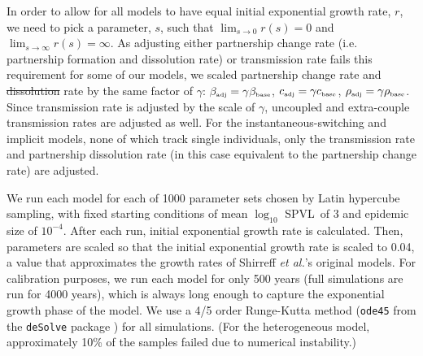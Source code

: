 \documentclass[10pt,letterpaper]{article}
\newcommand{\Lspvl}{$\log_{10}$ SPVL}
\newcommand{\etal}{\textit{et al.}}
\newcommand{\tsub}[2]{#1_{{\textrm{\tiny #2}}}}
\providecommand{\DIFaddtex}[1]{{\protect\color{blue}\uwave{#1}}} %
\providecommand{\DIFdeltex}[1]{{\protect\color{red}\sout{#1}}}                      %
\providecommand{\DIFaddbegin}{} %
\providecommand{\DIFaddend}{} %
\providecommand{\DIFdelbegin}{} %
\providecommand{\DIFdelend}{} %
\providecommand{\DIFadd}[1]{\texorpdfstring{\DIFaddtex{#1}}{#1}} %
\providecommand{\DIFdel}[1]{\texorpdfstring{\DIFdeltex{#1}}{}} %
\newcommand{\DIFscaledelfig}{0.5}
\newlength{\DIFdelgraphicswidth} %
\newlength{\DIFdelgraphicsheight} %
\newcommand{\DIFaddincludegraphics}[2][]{{\color{blue}\fbox{\DIFOincludegraphics[#1]{#2}}}} %
\newcommand{\DIFdelincludegraphics}[2][]{%
\sbox{\DIFdelgraphicsbox}{\DIFOincludegraphics[#1]{#2}}%
\settoboxwidth{\DIFdelgraphicswidth}{\DIFdelgraphicsbox} %
\settoboxtotalheight{\DIFdelgraphicsheight}{\DIFdelgraphicsbox} %
\scalebox{\DIFscaledelfig}{%
\parbox[b]{\DIFdelgraphicswidth}{\usebox{\DIFdelgraphicsbox}\\[-\baselineskip] \rule{\DIFdelgraphicswidth}{0em}}\llap{\resizebox{\DIFdelgraphicswidth}{\DIFdelgraphicsheight}{%
\setlength{\unitlength}{\DIFdelgraphicswidth}%
\begin{picture}(1,1)%
\thicklines\linethickness{2pt} %
{\color[rgb]{1,0,0}\put(0,0){\framebox(1,1){}}}%
{\color[rgb]{1,0,0}\put(0,0){\line( 1,1){1}}}%
{\color[rgb]{1,0,0}\put(0,1){\line(1,-1){1}}}%
\end{picture}%
}\hspace*{3pt}}} %
} %
\DeclareRobustCommand{\DIFaddbegin}{\DIFOaddbegin \let\includegraphics\DIFaddincludegraphics} %
\DeclareRobustCommand{\DIFaddend}{\DIFOaddend \let\includegraphics\DIFOincludegraphics} %
\DeclareRobustCommand{\DIFdelbegin}{\DIFOdelbegin \let\includegraphics\DIFdelincludegraphics} %
\DeclareRobustCommand{\DIFdelend}{\DIFOaddend \let\includegraphics\DIFOincludegraphics} %
\begin{document}
In order to allow for all models to have equal initial exponential
growth rate, $r$, we need to pick a parameter, $s$, such that
$\lim_{s\to 0} r(s) = 0$ and $\lim_{s\to\infty} r(s) = \infty$. As
adjusting either partnership change rate (i.e. partnership formation
and dissolution rate) or transmission rate fails this requirement for
some of our models, we scaled \DIFaddbegin \DIFadd{both }\DIFaddend partnership change rate and
\DIFdelbegin \DIFdel{dissolution }\DIFdelend \DIFaddbegin \DIFadd{transmission }\DIFaddend rate by the same factor of $\gamma$: $\tsub{\beta}{adj} =
\gamma \tsub{\beta}{base}$, $\tsub{c}{adj} = \gamma \tsub{c}{base}$,
$\tsub{\rho}{adj} = \gamma \tsub{\rho}{base}$. Since transmission rate
is adjusted by the scale of $\gamma$, uncoupled and extra-couple
transmission rates are adjusted as well. For the instantaneous-switching
and implicit models, none of which track single individuals, 
only the transmission rate and partnership
dissolution rate (in this case equivalent to the partnership change
rate) are adjusted.

We run each model for each of 1000 parameter sets chosen by Latin hypercube sampling, with fixed starting conditions
of mean \Lspvl\ of 3 and epidemic size of $10^{-4}$. After each run, initial exponential growth rate is calculated. Then, parameters are scaled so that the initial exponential growth rate is scaled to 0.04, a value that approximates the growth rates of Shirreff \etal's original models.
For calibration purposes, we run each model for only 500 years
(full simulations are run for 4000 years), which is always long
enough to capture the exponential growth phase of the model. 
We use a 4/5 order 
Runge-Kutta method (\texttt{ode45} from the \texttt{deSolve} package
\cite{soetaert_solving_2010}) for all simulations. 
(For the heterogeneous model, approximately
10\% of the samples failed due to numerical instability.)
\end{document}

